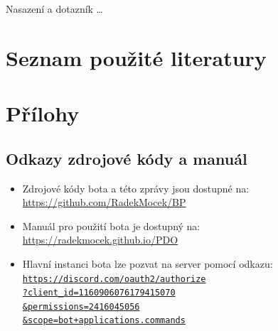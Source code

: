 \documentclass[FM]{tulthesis}
\begin{document}
	
	Nasazení a dotazník \dots %

	\chapter*{Seznam použité literatury}
	\printbibliography[heading=none]
	
	\appendix
	\chapter{Přílohy}
	
	\section{Odkazy zdrojové kódy a manuál}
	
	\begin{itemize}
		\item Zdrojové kódy bota a této zprávy jsou dostupné na: \\\url{https://github.com/RadekMocek/BP}%
		\item Manuál pro použití bota je dostupný na: \\\url{https://radekmocek.github.io/PDO}%
		\item Hlavní instanci bota lze pozvat na server pomocí odkazu: \\ \href{https://discord.com/oauth2/authorize?client_id=1160906076179415070&permissions=2416045056&scope=bot+applications.commands}{\texttt{https://discord.com/oauth2/authorize\\?client\_id=1160906076179415070\\\&permissions=2416045056\\\&scope=bot+applications.commands}}%
	\end{itemize}
	
\end{document}
